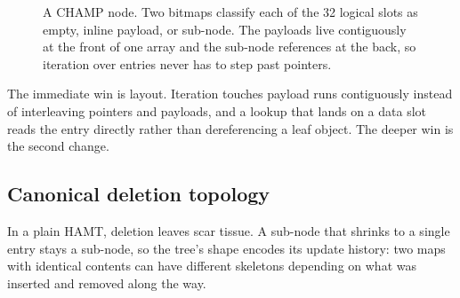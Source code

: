 \documentclass[11pt,twoside,openright]{book}
\newcommand{\code}[1]{\texorpdfstring{\textcolor{d7ink}{\texttt{#1}}}{#1}}
\begin{document}
\begin{figure}[htbp]
\centering
{}
\caption{A CHAMP node. Two bitmaps classify each of the 32 logical slots as
empty, inline payload, or sub-node. The payloads live contiguously at the front
of one array and the sub-node references at the back, so iteration over entries
never has to step past pointers.}
\label{fig:champnode}
\end{figure}

The immediate win is layout. Iteration touches payload runs contiguously instead
of interleaving pointers and payloads, and a lookup that lands on a data slot
reads the entry directly rather than dereferencing a leaf object. The deeper win
is the second change.

\subsection{Canonical deletion topology}

In a plain HAMT, deletion leaves scar tissue. A sub-node that shrinks to a single
entry stays a sub-node, so the tree's shape encodes its update history: two maps
with identical contents can have different skeletons depending on what was
inserted and removed along the way.
\end{document}
